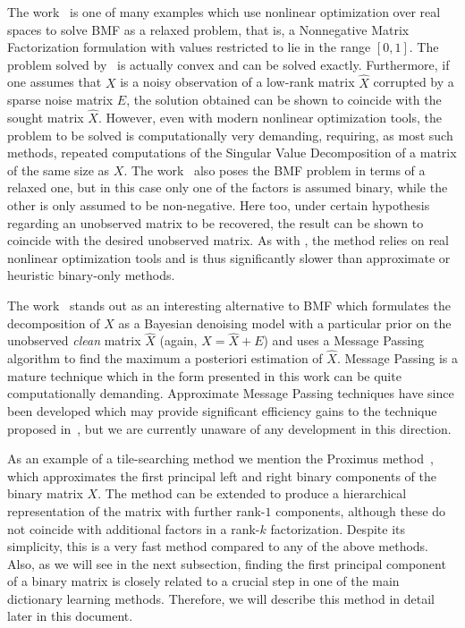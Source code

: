 \documentclass[twocolumn]{IEEEtran}
\theoremstyle{definition}
\begin{document}
The work~\cite{bmf07} is one of many examples which use nonlinear optimization over real spaces to solve BMF as a relaxed problem, that is, a Nonnegative Matrix Factorization formulation with values restricted to lie in the range $[0,1]$. The problem solved by~\cite{bmf07} is actually convex and can be solved exactly. Furthermore, if one assumes that $X$ is a noisy observation of a low-rank matrix $\hat{X}$ corrupted by a sparse noise matrix $E$, the solution obtained can be shown to coincide with the sought matrix $\hat{X}$. However, even with modern nonlinear optimization tools, the problem to be solved is computationally very demanding, requiring, as most such methods, repeated computations of the Singular Value Decomposition of a matrix of the same size as $X$.
The work~\cite{bmf13} also poses the BMF problem in terms of a relaxed one, but in this case only one of the factors is assumed binary, while the other is only assumed to be non-negative. Here too, under certain hypothesis regarding an unobserved matrix to be recovered, the result can be shown to coincide with the desired unobserved matrix. As with \cite{bmf07}, the method relies on real nonlinear optimization tools and is thus significantly slower than approximate or heuristic binary-only methods.

The work~\cite{bmf-mp} stands out as an interesting alternative to BMF which formulates the decomposition of $X$ as a Bayesian denoising model with a particular prior on the unobserved \emph{clean} matrix $\hat{X}$ (again, $X=\hat{X}+E$) and uses a Message Passing algorithm to find the maximum a posteriori estimation of $\hat{X}$. Message Passing is a mature technique which in the form presented in this work can be quite computationally demanding. Approximate Message Passing \cite{amp,gamp} techniques have since been developed which may provide significant efficiency gains to the technique proposed in~\cite{bmf06}, but we are currently unaware of any development in this direction.

As an example of a tile-searching method we mention the Proximus method~\cite{proximus}, which approximates the first principal left and right binary components of the binary matrix $X$. The method can be extended to produce a hierarchical representation of the matrix with further rank-$1$ components, although these do not coincide with additional factors in a rank-$k$ factorization. Despite its simplicity, this is a very fast method compared to any of the above methods. Also, as we will see in the next subsection, finding the first principal component of a binary matrix is closely related to a crucial step in one of the main dictionary learning methods. Therefore, we will describe this method in detail later in this document. 
\end{document}
